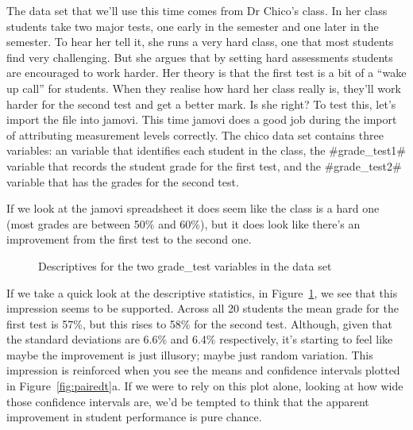 The data set that we'll use this time comes from Dr Chico's class. In her class students take two major tests, one early in the semester and one later in the semester. To hear her tell it, she runs a very hard class, one that most students find very challenging. But she argues that by setting hard assessments students are encouraged to work harder. Her theory is that the first test is a bit of a ``wake up call'' for students. When they realise how hard her class really is, they'll work harder for the second test and get a better mark. Is she right? To test this, let's import the  file into jamovi. This time jamovi does a good job during the import of attributing measurement levels correctly. The chico data set contains three variables: an  variable that identifies each student in the class, the \rtextverb#grade\_test1# variable that records the student grade for the first test, and the \rtextverb#grade\_test2# variable that has the grades for the second test. 

If we look at the jamovi spreadsheet it does seem like the class is a hard one (most grades are between 50\% and 60\%), but it does look like there's an improvement from the first test to the second one. 

\vspace{0.5cm}
\begin{figure}[htb]
\begin{center}
\caption{Descriptives for the two grade\_test variables in the  data set}
\HR
\label{fig:ttest_paired1}
\end{center}
\end{figure}

If we take a quick look at the descriptive statistics, in Figure~\ref{fig:ttest_paired1}, we see that this impression seems to be supported. Across all 20 students the mean grade for the first test is 57\%, but this rises to 58\% for the second test. Although, given that the standard deviations are 6.6\% and 6.4\% respectively, it's starting to feel like maybe the improvement is just illusory; maybe just random variation. This impression is reinforced when you see the means and confidence intervals plotted in Figure~\ref{fig:pairedt}a. If we were to rely on this plot alone, looking at how wide those confidence intervals are, we'd be tempted to think that the apparent improvement in student performance is pure chance.

